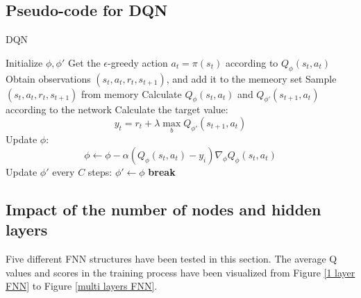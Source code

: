 \documentclass{article}
\begin{document}
\subsection{Pseudo-code for DQN}

\begin{algorithm}[!htbp]
  \caption{DQN}
  \begin{algorithmic}[1]
    \State Initialize $\phi,\phi'$
        \State Get the $\epsilon$-greedy action $a_t=\pi(s_t)$ according to $Q_{\phi}(s_t,a_t)$
        \State Obtain observations $(s_t,a_t,r_t,s_{t+1})$, and add it to the memeory set
          \State Sample $(s_t,a_t,r_t,s_{t+1})$ from memory
          \State Calculate $Q_{\phi}(s_t,a_t)$ and $Q_{\phi'}(s_{t+1},a_t)$ according to the network
          \State Calculate the target value:
          $$y_t=r_t+\lambda\max_{b}Q_{\phi'}(s_{t+1},a_t)$$
          \State Update $\phi$:
          $$\phi\leftarrow\phi-\alpha(Q_{\phi}(s_t,a_t)-y_i)\nabla_{\phi}Q_{\phi}(s_t,a_t)$$
        \EndFor
      \EndFor
      \State Update $\phi'$ every $C$ steps: $\phi'\leftarrow\phi$
        \State \textbf{break}
      \EndIf
    \EndFor
  \end{algorithmic}
\end{algorithm}

\subsection{Impact of the number of nodes and hidden layers}

Five different FNN structures have been tested in this section. The average Q values and scores in the
training process have been visualized from Figure \ref{1 layer FNN} to Figure \ref{multi layers FNN}.
\end{document}
